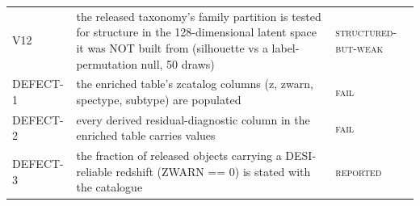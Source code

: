 \begin{ruledtabular}
\begin{tabular}{l p{} l}
V12 & the released taxonomy's family partition is tested for structure in the 128-dimensional latent space it was NOT built from (silhouette vs a label-permutation null, 50 draws) & \textsc{structured-but-weak} \\
DEFECT-1 & the enriched table's zcatalog columns (z, zwarn, spectype, subtype) are populated & \textsc{fail} \\
DEFECT-2 & every derived residual-diagnostic column in the enriched table carries values & \textsc{fail} \\
DEFECT-3 & the fraction of released objects carrying a DESI-reliable redshift (ZWARN == 0) is stated with the catalogue & \textsc{reported} \\
\end{tabular}
\end{ruledtabular}
